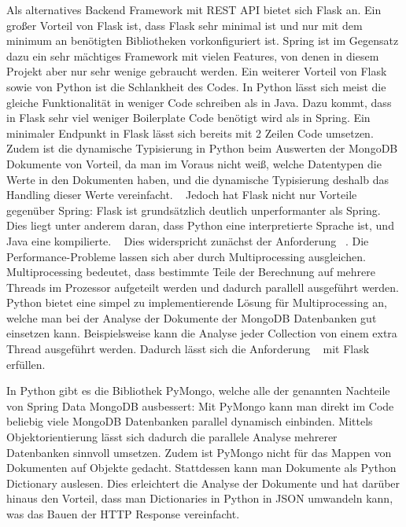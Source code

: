 Als alternatives Backend Framework mit REST API bietet sich Flask an.
Ein großer Vorteil von Flask ist, dass Flask sehr minimal ist und nur mit dem minimum an benötigten Bibliotheken vorkonfiguriert ist.
Spring ist im Gegensatz dazu ein sehr mächtiges Framework mit vielen Features, von denen in diesem Projekt aber nur sehr wenige gebraucht werden.
Ein weiterer Vorteil von Flask sowie von Python ist die Schlankheit des Codes.
In Python lässt sich meist die gleiche Funktionalität in weniger Code schreiben als in Java.
Dazu kommt, dass in Flask sehr viel weniger Boilerplate Code benötigt wird als in Spring.
Ein minimaler Endpunkt in Flask lässt sich bereits mit 2 Zeilen Code umsetzen.
Zudem ist die dynamische Typisierung in Python beim Auswerten der MongoDB Dokumente von Vorteil, da man im Voraus nicht weiß, welche Datentypen die Werte in den Dokumenten haben, und die dynamische Typisierung deshalb das Handling dieser Werte vereinfacht.
~\autocite{khoirom2020comparative}
Jedoch hat Flask nicht nur Vorteile gegenüber Spring:
Flask ist grundsätzlich deutlich unperformanter als Spring.
Dies liegt unter anderem daran, dass Python eine interpretierte Sprache ist, und Java eine kompilierte.
~\autocite{sverker:rest_comparison}
Dies widerspricht zunächst der Anforderung ~.
Die Performance-Probleme lassen sich aber durch Multiprocessing ausgleichen.
Multiprocessing bedeutet, dass bestimmte Teile der Berechnung auf mehrere Threads im Prozessor aufgeteilt werden und dadurch parallell ausgeführt werden.
Python bietet eine simpel zu implementierende Lösung für Multiprocessing an, welche man bei der Analyse der Dokumente der MongoDB Datenbanken gut einsetzen kann.
Beispielsweise kann die Analyse jeder Collection von einem extra Thread ausgeführt werden.
Dadurch lässt sich die Anforderung ~ mit Flask erfüllen.

In Python gibt es die Bibliothek PyMongo, welche alle der genannten Nachteile von Spring Data MongoDB ausbessert:
Mit PyMongo kann man direkt im Code beliebig viele MongoDB Datenbanken parallel dynamisch einbinden.
Mittels Objektorientierung lässt sich dadurch die parallele Analyse mehrerer Datenbanken sinnvoll umsetzen.
Zudem ist PyMongo nicht für das Mappen von Dokumenten auf Objekte gedacht.
Stattdessen kann man Dokumente als Python Dictionary auslesen.
Dies erleichtert die Analyse der Dokumente und hat darüber hinaus den Vorteil, dass man Dictionaries in Python in JSON umwandeln kann, was das Bauen der HTTP Response vereinfacht.
~\autocite{mongodb:pymongo}

